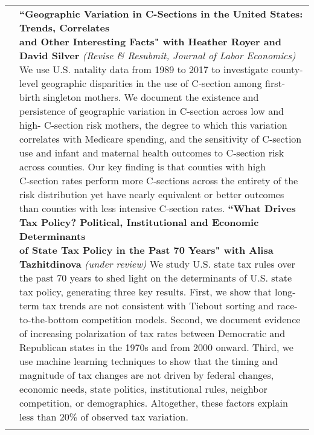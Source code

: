 \documentclass[11pt]{article}
\begin{document}
\begin{tabularx}{\textwidth}{@{}Y Z@{}}
	&
	\textbf{``Geographic Variation in C-Sections in the United States: Trends, Correlates \newline and Other Interesting Facts" with Heather Royer and David Silver} \newline \textit{(Revise \& Resubmit, Journal of Labor Economics)} \newline
	\vspace{-8pt} \newline
	We use U.S. natality data from 1989 to 2017 to investigate county-level geographic disparities in the use of C‑section among ﬁrst-birth singleton mothers. We document the existence and persistence of geographic variation in C‑section across low and high- C‑section risk mothers, the degree to which this variation correlates with Medicare spending, and the sensitivity of C‑section use and infant and maternal health outcomes to C‑section risk across counties. Our key ﬁnding is that counties with high C‑section rates perform more C‑sections across the entirety of the risk distribution yet have nearly equivalent or better outcomes than counties with less intensive C‑section rates.  \href{https://www.s-robinson.com/research/Robinson_Royer_Silver_CSection.pdf}{\color{blue}{[Link to paper]}}
	\vspace{20pt} \newline
	\textbf{``What Drives Tax Policy? Political, Institutional and Economic Determinants  \newline of State Tax Policy in the Past 70 Years" with Alisa Tazhitdinova} \textit{(under review)} 
	\vspace{-8pt} \newline 
	We study U.S. state tax rules over the past 70 years to shed light on the determinants of U.S. state tax policy, generating three key results. First, we show that long-term tax trends are not consistent with Tiebout sorting and race-to-the-bottom competition models. Second, we document evidence of increasing polarization of tax rates between Democratic and Republican states in the 1970s and from 2000 onward. Third, we use machine learning techniques to show that the timing and magnitude of tax changes are not driven by federal changes, economic needs, state politics, institutional rules, neighbor competition, or demographics. Altogether, these factors explain less than 20\% of observed tax variation.  \vspace{2pt} \newline  \href{https://www.s-robinson.com/research/Robinson_Tazhitdinova_Tax_Policy_Determinants.pdf}{\color{blue}{[Link to paper]}}
	\vspace{0pt}
	\\ \addlinespace[20pt] 
	


\end{tabularx}
\end{document}
